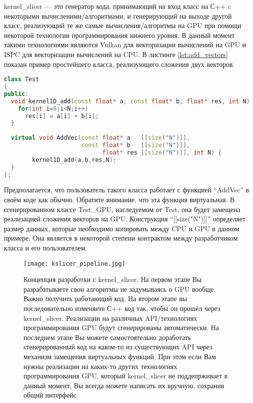 \documentclass[11pt,fleqn,english,russian]{report} %
\begin{document}
kernel\_slicer --- это генератор кода, принимающий на вход класс на С++ c некоторыми вычисленими/алгоритмами, и генерирующий на выходе другой класс, реализующий те же самые вычисления/алгоритмы на GPU при помощи некоторой технологии программирования нижнего уровня. В данный момент такими технологиями являются Vulkan для векторизации вычислений на GPU и ISPC \cite{ispc} для векторизации вычислений на CPU. В листинге \ref{lst:add_vectors} показан пример простейшего класса, реализующего сложения двух векторов.

\begin{lstlisting}[language=C++, caption=сложение двух векторов]
class Test 
{
public:	
  void kernel1D_add(const float* a, const float* b, float* res, int N) {
    for(int i=0;i<N;i++)
      res[i] = a[i] + b[i];
  } 
	
  virtual void AddVec(const float* a   [[size("N")]], 
                      const float* b   [[size("N")]], 
                            float* res [[size("N")]], int N) {
		kernel1D_add(a,b,res,N); 
  } 	
};
\end{lstlisting}\label{lst:add_vectors}

Предполагается, что пользователь такого класса работает с функцией ``AddVec'' в своём коде как обычно. Обратите внимание, что эта функция виртуальная. В сгенерированном классе Test\_GPU, наследуемом от Test, она будет замещена реализацией сложения векторов на GPU. Конструкция ``[[size("N")]]'' определяет размер данных, которые необходимо копировать между CPU и GPU в данном примере. Она является в некоторой степени контрактом между разработчиком класса и его пользователем.


\begin{figure}[h!]
	\centering
	\texttt{[image: kslicer\_pipeline.jpg]}
	\caption{Концепция разработки с kernel\_slicer. На первом этапе Вы разрабатываете свои алгоритмы не задумываясь о GPU вообще. Важно получить работающий код. На втором этапе вы последовательно изменяете С++ код так, чтобы он прошёл через kernel\_slicer. Реализации на различных API/технологиях программирования GPU будут сгенерированы автоматически. На последнем этапе Вы можете самостоятельно доработать сгенерированный код на каком-то из существующих API через механизм замещения виртуальных функций. При этом если Вам нужны реализации на каких-то других технологиях программирования GPU, который kernel\_slicer не поддепрживает в данный момент, Вы всегда можете написать их вручную, сохранив общий интерфейс. }
\end{figure}
\end{document}

